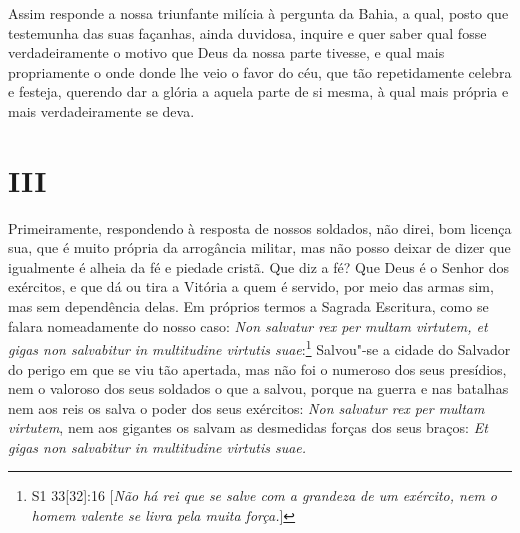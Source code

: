 Assim responde a nossa triunfante milícia à pergunta da Bahia, a qual,
posto que testemunha das suas façanhas, ainda duvidosa, inquire e quer
saber qual fosse verdadeiramente o motivo que Deus da nossa parte
tivesse, e qual mais propriamente o onde donde lhe veio o favor do céu,
que tão repetidamente celebra e festeja, querendo dar a glória a aquela
parte de si mesma, à qual mais própria e mais verdadeiramente se deva.

\section*{III}

Primeiramente, respondendo à resposta de nossos soldados, não direi, bom
licença sua, que é muito própria da arrogância militar, mas não posso
deixar de dizer que igualmente é alheia da fé e piedade cristã. Que diz
a fé? Que Deus é o Senhor dos exércitos, e que dá ou tira a Vitória a
quem é servido, por meio das armas sim, mas sem dependência delas. Em
próprios termos a Sagrada Escritura, como se falara nomeadamente do
nosso caso: \emph{Non salvatur rex per multam virtutem, et gigas non
salvabitur in multitudine virtutis suae}:\footnote{S1 33[32]:16 [\textit{Não há rei que se salve com a grandeza de um exército, nem o homem valente se livra pela muita força.}]} Salvou"-se a
cidade do Salvador do perigo em que se viu tão apertada, mas não foi o
numeroso dos seus presídios, nem o valoroso dos seus soldados o que a
salvou, porque na guerra e nas batalhas nem aos reis os salva o poder
dos seus exércitos: \emph{Non salvatur rex per multam virtutem}, nem
aos gigantes os salvam as desmedidas forças dos seus braços: \emph{Et
gigas non salvabitur in multitudine virtutis suae.}

